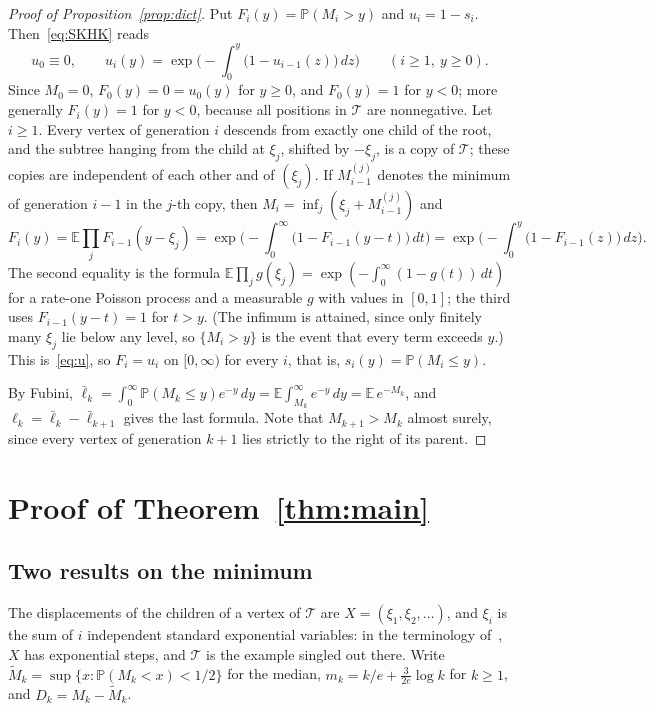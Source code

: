 \documentclass[11pt]{amsart}
\theoremstyle{definition}
\theoremstyle{remark}
\numberwithin{equation}{section}
\newcommand{\PP}{\mathbb P}
\newcommand{\E}{\mathbb E}
\newcommand{\cT}{\mathcal T}
\newcommand{\lb}{\bar\ell}
\begin{document}
\begin{proof}[Proof of Proposition~\ref{prop:dict}]
Put $F_i(y)=\PP(M_i>y)$ and $u_i=1-s_i$. Then~\eqref{eq:SKHK} reads
\begin{equation}\label{eq:u}
u_0\equiv0,\qquad u_i(y)=\exp\Big(-\int_0^y\big(1-u_{i-1}(z)\big)\,dz\Big)\qquad(i\ge1,\ y\ge0).
\end{equation}
Since $M_0=0$, $F_0(y)=0=u_0(y)$ for $y\ge0$, and $F_0(y)=1$ for $y<0$; more generally $F_i(y)=1$ for $y<0$, because all positions in $\cT$ are nonnegative. Let $i\ge1$. Every vertex of generation $i$ descends from exactly one child of the root, and the subtree hanging from the child at $\xi_j$, shifted by $-\xi_j$, is a copy of $\cT$; these copies are independent of each other and of $(\xi_j)$. If $M^{(j)}_{i-1}$ denotes the minimum of generation $i-1$ in the $j$-th copy, then $M_i=\inf_j(\xi_j+M^{(j)}_{i-1})$ and
\[
F_i(y)=\E\prod_j F_{i-1}(y-\xi_j)=\exp\Big(-\int_0^\infty\big(1-F_{i-1}(y-t)\big)\,dt\Big)=\exp\Big(-\int_0^y\big(1-F_{i-1}(z)\big)\,dz\Big).
\]
The second equality is the formula $\E\prod_j g(\xi_j)=\exp(-\int_0^\infty(1-g(t))\,dt)$ for a rate-one Poisson process and a measurable $g$ with values in $[0,1]$; the third uses $F_{i-1}(y-t)=1$ for $t>y$. (The infimum is attained, since only finitely many $\xi_j$ lie below any level, so $\{M_i>y\}$ is the event that every term exceeds $y$.) This is~\eqref{eq:u}, so $F_i=u_i$ on $[0,\infty)$ for every $i$, that is, $s_i(y)=\PP(M_i\le y)$.

By Fubini, $\lb_k=\int_0^\infty\PP(M_k\le y)e^{-y}\,dy=\E\int_{M_k}^\infty e^{-y}\,dy=\E\,e^{-M_k}$, and $\ell_k=\lb_k-\lb_{k+1}$ gives the last formula. Note that $M_{k+1}>M_k$ almost surely, since every vertex of generation $k+1$ lies strictly to the right of its parent.
\end{proof}

\section{Proof of Theorem~\ref{thm:main}}\label{sec:main}

\subsection{Two results on the minimum}
The displacements of the children of a vertex of $\cT$ are $X=(\xi_1,\xi_2,\dots)$, and $\xi_i$ is the sum of $i$ independent standard exponential variables: in the terminology of~\cite{ABF}, $X$ has exponential steps, and $\cT$ is the example singled out there. Write $\widetilde M_k=\sup\{x:\PP(M_k<x)<1/2\}$ for the median, $m_k=k/e+\tfrac{3}{2e}\log k$ for $k\ge1$, and $D_k=M_k-\widetilde M_k$.
\end{document}
